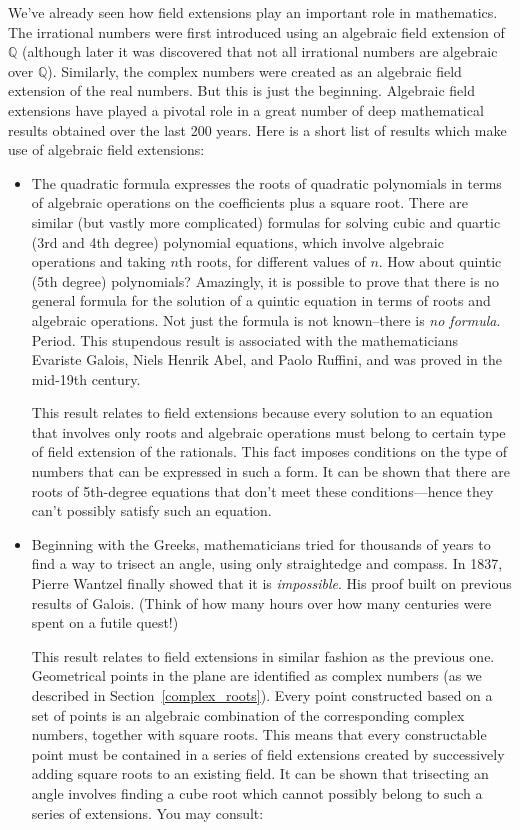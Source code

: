 We've already seen how field extensions play an important role in mathematics.  The irrational numbers were first introduced using an algebraic  field extension  of $\mathbb{Q}$  (although later it was discovered that not all irrational numbers are algebraic over $\mathbb{Q}$).  Similarly, the complex numbers were created as an algebraic field extension of the real numbers.  But this is just the beginning. Algebraic field extensions have played a pivotal role in a great number of deep mathematical results obtained over the last 200 years. Here is a short list of results which make use of algebraic field extensions:

\begin{itemize}
\item 
The quadratic formula expresses the roots of quadratic polynomials  in terms of algebraic operations on the coefficients plus a square root. There are similar (but vastly more complicated) formulas for solving cubic and quartic (3rd and 4th degree)  polynomial equations, which involve algebraic operations and  taking $n$th roots, for different values of $n$.  How about quintic (5th degree) polynomials?  Amazingly, it is possible to prove that there is no general formula for the solution of a quintic equation in terms of roots and algebraic operations.  Not just the formula is not known--there is \emph{no formula}. Period. This stupendous result is associated with the mathematicians Evariste Galois, Niels Henrik Abel, and Paolo Ruffini, and was proved in the mid-19th century.

This result relates to field extensions because every solution to an equation that involves only roots and algebraic operations must belong to certain type of field extension of the rationals. This fact imposes conditions on the type of numbers that can be expressed in such a form. It can be shown that there are roots of 5th-degree equations that don't meet these conditions---hence they can't possibly satisfy such an equation.

\item
Beginning with the Greeks,  mathematicians tried for thousands of years to find a way to trisect an angle, using only straightedge and compass. In 1837, Pierre Wantzel finally showed that it is \emph{impossible}. His proof built on previous results of Galois. (Think of how many hours over how many centuries were spent on a futile quest!)

This result relates to field extensions in similar fashion as the previous one. Geometrical points in the plane are identified as complex numbers (as we described in Section~\ref{complex_roots}). Every point constructed based on a set of  points is an algebraic combination of the corresponding complex numbers, together with square roots. This means that every constructable point must be contained in a series of field extensions created by successively adding square roots to an existing field. It can be shown that trisecting an angle involves finding a cube root which cannot possibly belong to such a series of extensions.  You may consult:


\end{itemize}
